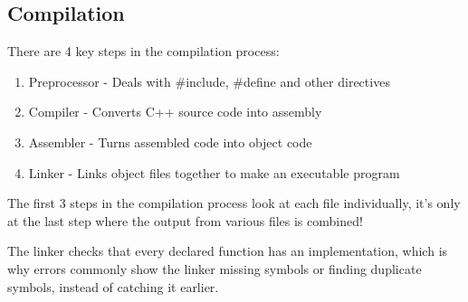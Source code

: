 \documentclass[]{article}
\begin{document}
\subsection{Compilation}

There are 4 key steps in the compilation process:
\begin{enumerate}
    \item Preprocessor - Deals with \#include, \#define and other directives
    \item Compiler - Converts C++ source code into assembly
    \item Assembler - Turns assembled code into object code
    \item Linker - Links object files together to make an executable program
\end{enumerate}

\begin{note}
The first 3 steps in the compilation process look at each file individually, it's only at the last step where the output from various files is combined!
\end{note}

The linker checks that every declared function has an implementation, which is why errors commonly show the linker missing symbols or finding duplicate symbols, instead of catching it earlier.
\end{document}

